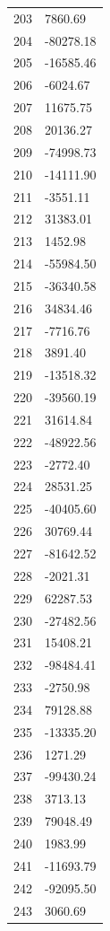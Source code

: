 \documentclass[a4paper,11pt]{article}
\begin{document}
\begin{center}
\begin{longtable}{|R{1.5cm}|R{2.5cm}|}
  203 &      7860.69 \\
  204 &    -80278.18 \\
  205 &    -16585.46 \\
  206 &     -6024.67 \\
  207 &     11675.75 \\
  208 &     20136.27 \\
  209 &    -74998.73 \\
  210 &    -14111.90 \\
  211 &     -3551.11 \\
  212 &     31383.01 \\
  213 &      1452.98 \\
  214 &    -55984.50 \\
  215 &    -36340.58 \\
  216 &     34834.46 \\
  217 &     -7716.76 \\
  218 &      3891.40 \\
  219 &    -13518.32 \\
  220 &    -39560.19 \\
  221 &     31614.84 \\
  222 &    -48922.56 \\
  223 &     -2772.40 \\
  224 &     28531.25 \\
  225 &    -40405.60 \\
  226 &     30769.44 \\
  227 &    -81642.52 \\
  228 &     -2021.31 \\
  229 &     62287.53 \\
  230 &    -27482.56 \\
  231 &     15408.21 \\
  232 &    -98484.41 \\
  233 &     -2750.98 \\
  234 &     79128.88 \\
  235 &    -13335.20 \\
  236 &      1271.29 \\
  237 &    -99430.24 \\
  238 &      3713.13 \\
  239 &     79048.49 \\
  240 &      1983.99 \\
  241 &    -11693.79 \\
  242 &    -92095.50 \\
  243 &      3060.69 \\

\end{longtable}
\end{center}
\end{document}
